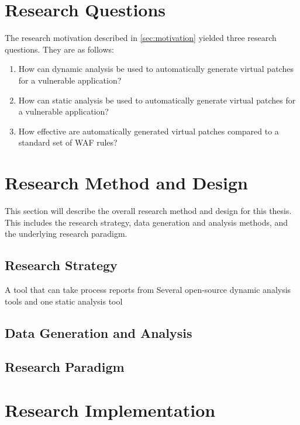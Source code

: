 \section{Research Questions} \label{sec:questions}
The research motivation described in \ref{sec:motivation} yielded three research questions. They are as follows:
\begin{enumerate}
	\item How can dynamic analysis be used to automatically generate virtual patches for a vulnerable application?
	\item How can static analysis be used to automatically generate virtual patches for a vulnerable application?
	\item How effective are automatically generated virtual patches compared to a standard set of WAF rules?
\end{enumerate}

\section{Research Method and Design} \label{sec:method}
This section will describe the overall research method and design for this thesis. This includes the research strategy, data generation and analysis methods, and the underlying research paradigm.

\subsection{Research Strategy} \label{subsec:strategy}
A tool that can take process reports from Several open-source dynamic analysis tools and one static analysis tool


\subsection{Data Generation and Analysis}\label{subsec:data}
\subsection{Research Paradigm}\label{subsec:paradigm}




\section{Research Implementation} \label{sec:implementation}